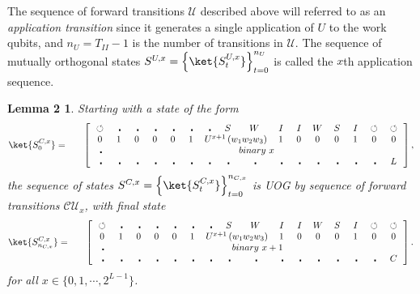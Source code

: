 \documentclass[11pt,letterpaper]{article}
\newtheorem*{lem2}{Lemma 2}
\newcommand{\<}{\langle}
\renewcommand{\>}{\rangle}
\newcommand{\tur}{\,\circlearrowleft\,}   %
\newcommand{\bul}{\:\:\centerdot\:}       %
\newcommand{\iga}{\:I\,}                  %
\newcommand{\wga}{W}						%
\newcommand{\sga}{\:S\,}					%
\begin{document}
The sequence of forward transitions $\mathcal{U}$ described above will referred to as an \emph{application transition} since it generates a single application of $U$ to the work qubits, and $n_U=T_{II}-1$ is the number of transitions in $\mathcal{U}$. The sequence of mutually orthogonal states $S^{U,x}=\left\{ \ket{S_t^{U,x}} \right\}_{t=0}^{n_U}$ is called the $x$th application sequence.
\begin{lem2}
Starting with a state of the form 
	\begin{eqnarray}
			\ket{S^{C,x}_0} &=& \quad \left[ \begin{array}{cccccccccccccccc}
				\tur & \bul & 
				\bul & \bul & \bul & \bul & \bul & \sga & \wga & \iga & \iga & 
			\wga & \sga & \iga & \tur & \tur
				\\		
				0    & 1    & 0    & 0    & 0    & 1    & 
				\multicolumn{3}{c}{U^{x+1}\left(w_1w_2w_3\right)}  &
				1    & 0    & 0    & 0    & 1    & 0 & 0
				\\
				\bul & \multicolumn{15}{c}{binary~x}
				\\
				\bul & \bul & \bul & \bul & \bul & \bul & \bul & \bul & \bul & \bul & \bul & \bul & \bul & \bul & \bul & L
		 	\end{array} \right], \label{endstate}
		\end{eqnarray}
the sequence of states $S^{C,x}=\left\{\ket{S^{C,x}_t}\right\}_{t= 0}^{n_{C,x}}$ is UOG by sequence of forward transitions $\mathcal{CU}_{x}$, with final state
	\begin{eqnarray}
			\ket{S^{C,x}_{n_{C,x}}} &=& \quad \left[ \begin{array}{cccccccccccccccc}
				\tur & \bul & 
				\bul & \bul & \bul & \bul & \bul & \sga & \wga & \iga & \iga & 
			\wga & \sga & \iga & \tur & \tur
				\\		
				0    & 1    & 0    & 0    & 0    & 1    & 
				\multicolumn{3}{c}{U^{x+1}\left(w_1w_2w_3\right)}  &
				1    & 0    & 0    & 0    & 1    & 0 & 0
				\\
				\bul & \multicolumn{15}{c}{binary~x+1}
				\\
				\bul & \bul & \bul & \bul & \bul & \bul & \bul & \bul & \bul & \bul & \bul & \bul & \bul & \bul & \bul & C
		 	\end{array} \right]. \label{endstate}
		\end{eqnarray}
for all $x\in\{0,1,\cdots,2^{L-1}\}$.
\end{lem2}
\end{document}
